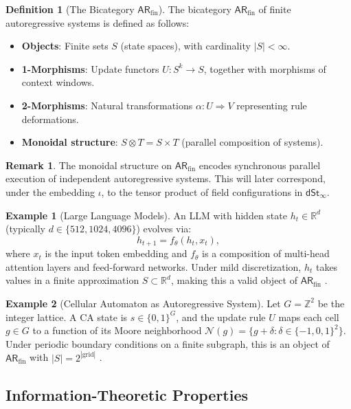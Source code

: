 \documentclass[a4paper,12pt]{article}
\theoremstyle{definition}
\newtheorem{definition}{Definition}[section]
\newtheorem{example}{Example}[section]
\newtheorem{remark}{Remark}[section]
\newcommand{\ARfin}{\mathsf{AR}_{\mathrm{fin}}}
\newcommand{\dSt}{\mathsf{dSt}_\infty}
\newcommand{\iotaf}{\iota}
\newcommand{\R}{\mathbb{R}}
\newcommand{\Z}{\mathbb{Z}}
\begin{document}
\begin{definition}[The Bicategory $\ARfin$]
\label{def:arfin}
The bicategory $\ARfin$ of finite autoregressive systems is defined as follows:
\begin{itemize}
    \item \textbf{Objects}: Finite sets $S$ (state spaces), with cardinality $|S| < \infty$.
    \item \textbf{1-Morphisms}: Update functors $U: S^k \to S$, together with morphisms of context windows.
    \item \textbf{2-Morphisms}: Natural transformations $\alpha: U \Rightarrow V$ representing rule deformations.
    \item \textbf{Monoidal structure}: $S \otimes T = S \times T$ (parallel composition of systems).
\end{itemize}
\end{definition}

\begin{remark}
The monoidal structure on $\ARfin$ encodes synchronous parallel execution of independent autoregressive systems. This will later correspond, under the embedding $\iotaf$, to the tensor product of field configurations in $\dSt$.
\end{remark}

\begin{example}[Large Language Models]
\label{ex:llm}
An LLM with hidden state $h_t \in \R^d$ (typically $d \in \{512, 1024, 4096\}$) evolves via:
\[
h_{t+1} = f_\theta(h_t, x_t),
\]
where $x_t$ is the input token embedding and $f_\theta$ is a composition of multi-head attention layers and feed-forward networks. Under mild discretization, $h_t$ takes values in a finite approximation $S \subset \R^d$, making this a valid object of $\ARfin$ \cite{Vaswani2017, Brown2020}.
\end{example}

\begin{example}[Cellular Automaton as Autoregressive System]
\label{ex:ca}
Let $G = \Z^2$ be the integer lattice. A CA state is $s \in \{0,1\}^G$, and the update rule $U$ maps each cell $g \in G$ to a function of its Moore neighborhood $\mathcal{N}(g) = \{g + \delta : \delta \in \{-1,0,1\}^2\}$. Under periodic boundary conditions on a finite subgraph, this is an object of $\ARfin$ with $|S| = 2^{|\text{grid}|}$ \cite{Wolfram2002, Conway1970}.
\end{example}

\subsection{Information-Theoretic Properties}
\end{document}
